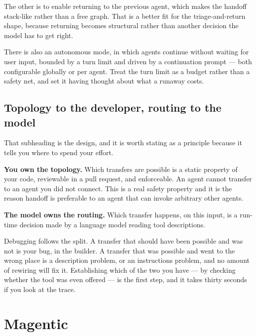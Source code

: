 The other is to enable returning to the previous agent, which makes the handoff
stack-like rather than a free graph. That is a better fit for the
triage-and-return shape, because returning becomes structural rather than
another decision the model has to get right.

There is also an autonomous mode, in which agents continue without waiting for
user input, bounded by a turn limit and driven by a continuation prompt --- both
configurable globally or per agent. Treat the turn limit as a budget rather than
a safety net, and set it having thought about what a runaway costs.

\subsection{Topology to the developer, routing to the model}

That subheading is the design, and it is worth stating as a principle because it
tells you where to spend your effort.

\textbf{You own the topology.} Which transfers are possible is a static property
of your code, reviewable in a pull request, and enforceable. An agent cannot
transfer to an agent you did not connect. This is a real safety property and it
is the reason handoff is preferable to an agent that can invoke arbitrary other
agents.

\textbf{The model owns the routing.} Which transfer happens, on this input, is a
run-time decision made by a language model reading tool descriptions.

Debugging follows the split. A transfer that should have been possible and was
not is your bug, in the builder. A transfer that was possible and went to the
wrong place is a description problem, or an instructions problem, and no amount
of rewiring will fix it. Establishing which of the two you have --- by checking
whether the tool was even offered --- is the first step, and it takes thirty
seconds if you look at the trace.

\section{Magentic}
\label{sec:orch-magentic}

